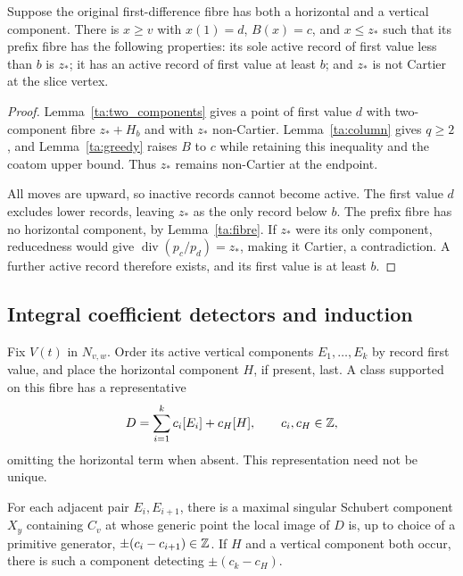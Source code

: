 \begin{proposition}\label{ta:horizontal}
Suppose the original first-difference fibre has both a horizontal and
a vertical component. There is $x\geq v$ with $x(1)=d$, $B(x)=c$,
and $x\leq z_*$ such that its prefix fibre has the following
properties: its sole active record of first value less than $b$ is
$z_*$; it has an active record of first value at least $b$; and
$z_*$ is not Cartier at the slice vertex.
\end{proposition}

\begin{proof}
Lemma~\ref{ta:two_components} gives a point of first value $d$ with
two-component fibre $z_*+H_b$ and with $z_*$ non-Cartier.
Lemma~\ref{ta:column} gives $q\geq2$, and Lemma~\ref{ta:greedy}
raises $B$ to $c$ while retaining this inequality and the coatom
upper bound. Thus $z_*$ remains non-Cartier at the endpoint.

All moves are upward, so inactive records cannot become active.
The first value $d$ excludes lower records, leaving $z_*$ as the
only record below $b$. The prefix fibre has no horizontal component,
by Lemma~\ref{ta:fibre}. If $z_*$ were its only component,
reducedness would give $\operatorname{div}(p_c/p_d)=z_*$, making
it Cartier, a contradiction. A further active record therefore exists,
and its first value is at least $b$.
\end{proof}

\subsection{Integral coefficient detectors and induction}

Fix $V(t)$ in $N_{v,w}$. Order its active vertical components
$E_1,\ldots,E_k$ by record first value, and place the horizontal
component $H$, if present, last. A class supported on this fibre has
a representative
\[
 D=\sum_{i=1}^k c_i[E_i]+c_H[H],\qquad c_i,c_H\in\mathbb Z,
\]
omitting the horizontal term when absent. This representation need
not be unique.

\begin{lemma}\label{ta:differences}
For each adjacent pair $E_i,E_{i+1}$, there is a maximal singular
Schubert component $X_y$ containing $C_v$ at whose generic point the
local image of $D$ is, up to choice of a
primitive generator, $\pm(c_i-c_{i+1})\in\mathbb Z$.
If $H$ and a vertical component both occur, there is such a component
detecting $\pm(c_k-c_H)$.
\end{lemma}

